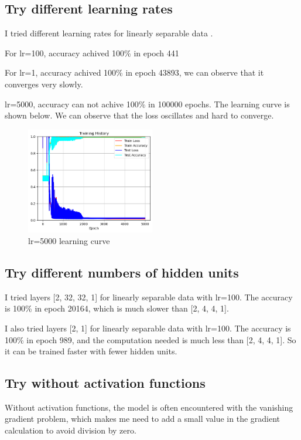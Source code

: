 \documentclass{homework}
\begin{document}
\subsection{Try different learning rates}

I tried different learning rates for linearly separable data .

For lr=100, accuracy achived 100\% in epoch 441

For lr=1, accuracy achived 100\% in epoch 43893, we can observe that it converges very slowly.

lr=5000, accuracy can not achive 100\% in 100000 epochs. The learning curve is shown below. We can observe that the loss oscillates and hard to converge.

\begin{figure}[H]
    \centering
    \includegraphics[width=0.5\textwidth]{linear_lr5000.png}
    \caption{lr=5000 learning curve}
\end{figure}

\subsection{Try different numbers of hidden units}

I tried layers [2, 32, 32, 1] for linearly separable data with lr=100. The accuracy is 100\% in epoch 20164, which is much slower than [2, 4, 4, 1].

I also tried layers [2, 1] for linearly separable data with lr=100. The accuracy is 100\% in epoch 989, and the computation needed is much less than [2, 4, 4, 1]. So it can be trained faster with fewer hidden units.

\subsection{Try without activation functions}

Without activation functions, the model is often encountered with the vanishing gradient problem, which makes me need to add a small value in the gradient calculation to avoid division by zero.
\end{document}
